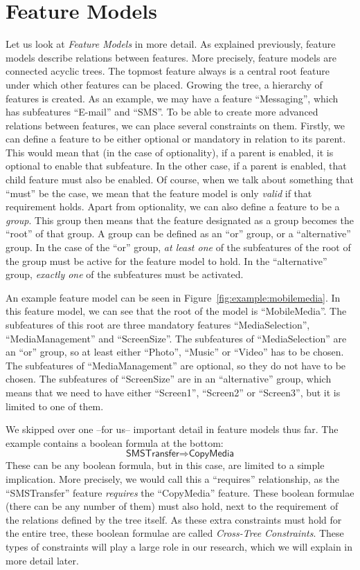 \section{Feature Models}\label{sec:featuremodels}
Let us look at \emph{Feature Models} in more detail. As explained previously,
feature models describe relations between features. More precisely, feature
models are connected acyclic trees. The topmost feature always is a central
root feature under which other features can be placed. Growing the tree, a
hierarchy of features is created. As an example, we may have a feature
``Messaging'', which has subfeatures ``E-mail'' and ``SMS''. To be able to
create more advanced relations between features, we can place several
constraints on them. Firstly, we can define a feature to be either optional or
mandatory in relation to its parent. This would mean that (in the case of
optionality), if a parent is enabled, it is optional to enable that subfeature.
In the other case, if a parent is enabled, that child feature must also be
enabled. Of course, when we talk about something that ``must'' be the case, we
mean that the feature model is only \emph{valid} if that requirement holds.
Apart from optionality, we can also define a feature to be a \emph{group}. This
group then means that the feature designated as a group becomes the ``root'' of
that group. A group can be defined as an ``or'' group, or a ``alternative''
group. In the case of the ``or'' group, \emph{at least one} of the subfeatures of
the root of the group must be active for the feature model to hold. In
the ``alternative'' group, \emph{exactly one} of the subfeatures must be
activated.

An example feature model can be seen in Figure~\ref{fig:example:mobilemedia}.
In this feature model, we can see that the root of the model is ``MobileMedia''.
The subfeatures of this root are three mandatory features ``MediaSelection'',
``MediaManagement'' and ``ScreenSize''. The subfeatures of ``MediaSelection''
are an ``or'' group, so at least either ``Photo'', ``Music'' or ``Video'' has
to be chosen. The subfeatures of ``MediaManagement'' are optional, so they do
not have to be chosen. The subfeatures of ``ScreenSize'' are in an
``alternative'' group, which means that we need to have either ``Screen1'',
``Screen2'' or ``Screen3'', but it is limited to one of them.

We skipped over one --for us-- important detail in feature models thus far. The
example contains a boolean formula at the bottom:
\[
    \textsf{SMSTransfer} \Rightarrow \textsf{CopyMedia}
\]
These can be any boolean formula, but in this case, are limited to a simple
implication. More precisely, we would call this a ``requires'' relationship, as
the ``SMSTransfer'' feature \emph{requires} the ``CopyMedia'' feature.
These boolean formulae (there can be any number of them) must also hold, next
to the requirement of the relations defined by the tree itself. As these extra
constraints must hold for the entire tree, these boolean formulae are called
\emph{Cross-Tree Constraints}. These types of constraints will play a large
role in our research, which we will explain in more detail later.

